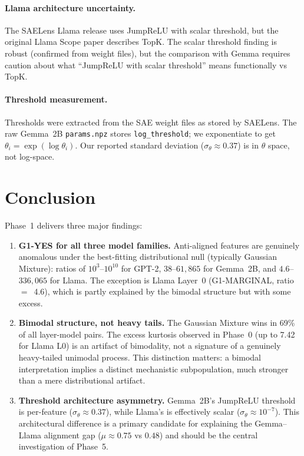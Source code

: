 \documentclass[11pt,a4paper]{article}
\begin{document}
\paragraph{Llama architecture uncertainty.} The SAELens Llama release uses JumpReLU with scalar threshold, but the original Llama Scope paper describes TopK. The scalar threshold finding is robust (confirmed from weight files), but the comparison with Gemma requires caution about what ``JumpReLU with scalar threshold'' means functionally vs TopK.

\paragraph{Threshold measurement.} Thresholds were extracted from the SAE weight files as stored by SAELens. The raw Gemma~2B \texttt{params.npz} stores \texttt{log\_threshold}; we exponentiate to get $\theta_i = \exp(\log\theta_i)$. Our reported standard deviation ($\sigma_\theta \approx 0.37$) is in $\theta$ space, not log-space.

\section{Conclusion}
\label{sec:conclusion}

Phase~1 delivers three major findings:

\begin{enumerate}
  \item \textbf{G1-YES for all three model families.} Anti-aligned features are genuinely anomalous under the best-fitting distributional null (typically Gaussian Mixture): ratios of $10^3$--$10^{10}$ for GPT-2, $38$--$61{,}865$ for Gemma~2B, and $4.6$--$336{,}065$ for Llama. The exception is Llama Layer~0 (G1-MARGINAL, ratio~$=$~4.6), which is partly explained by the bimodal structure but with some excess.

  \item \textbf{Bimodal structure, not heavy tails.} The Gaussian Mixture wins in 69\% of all layer-model pairs. The excess kurtosis observed in Phase~0 (up to 7.42 for Llama L0) is an artifact of bimodality, not a signature of a genuinely heavy-tailed unimodal process. This distinction matters: a bimodal interpretation implies a distinct mechanistic subpopulation, much stronger than a mere distributional artifact.

  \item \textbf{Threshold architecture asymmetry.} Gemma~2B's JumpReLU threshold is per-feature ($\sigma_\theta \approx 0.37$), while Llama's is effectively scalar ($\sigma_\theta \approx 10^{-7}$). This architectural difference is a primary candidate for explaining the Gemma--Llama alignment gap ($\mu \approx 0.75$ vs $0.48$) and should be the central investigation of Phase~5.
\end{enumerate}
\end{document}
